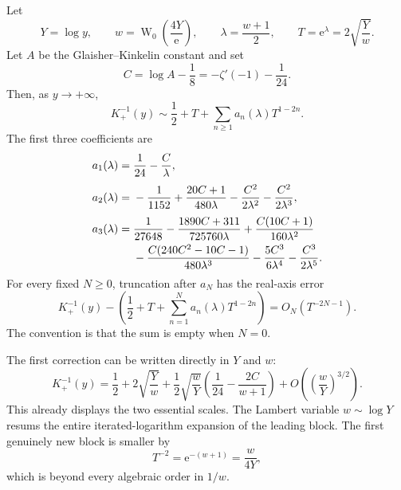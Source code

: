 \documentclass[11pt,oneside]{article}
\theoremstyle{plain}
\theoremstyle{definition}
\theoremstyle{remark}
\newcommand{\W}{\operatorname{W}}
\newcommand{\e}{\mathrm{e}}
\begin{document}
\begin{mainbox}
Let
\begin{equation}
 Y=\log y,
 \qquad w=\W_0\!\left(\frac{4Y}{\e}\right),
 \qquad \lambda=\frac{w+1}{2},
 \qquad T=\e^\lambda=2\sqrt{\frac{Y}{w}}.
 \label{eq:main-variables}
\end{equation}
Let \(A\) be the Glaisher--Kinkelin constant and set
\begin{equation}
 C=\log A-\frac18=-\zeta'(-1)-\frac1{24}.
 \label{eq:C-def}
\end{equation}
Then, as \(y\to+\infty\),
\begin{equation}
 K_+^{-1}(y)
 \sim \frac12+T+\sum_{n\ge1}a_n(\lambda)T^{1-2n}.
 \label{eq:main-transseries}
\end{equation}
The first three coefficients are
\begin{align}
 a_1(\lambda)={}&\frac1{24}-\frac{C}{\lambda},
 \label{eq:a1}\\[0.3em]
 a_2(\lambda)={}&-\frac1{1152}
 +\frac{20C+1}{480\lambda}
 -\frac{C^2}{2\lambda^2}
 -\frac{C^2}{2\lambda^3},
 \label{eq:a2}\\[0.3em]
 a_3(\lambda)={}&\frac1{27648}
 -\frac{1890C+311}{725760\lambda}
 +\frac{C(10C+1)}{160\lambda^2}
 \notag\\
 &-\frac{C(240C^2-10C-1)}{480\lambda^3}
 -\frac{5C^3}{6\lambda^4}
 -\frac{C^3}{2\lambda^5}.
 \label{eq:a3}
\end{align}
For every fixed \(N\ge0\), truncation after \(a_N\) has the real-axis error
\begin{equation}
 K_+^{-1}(y)-\left(\frac12+T+
       \sum_{n=1}^{N}a_n(\lambda)T^{1-2n}\right)
 =O_N(T^{-2N-1}).
 \label{eq:main-error}
\end{equation}
The convention is that the sum is empty when \(N=0\).
\end{mainbox}

The first correction can be written directly in \(Y\) and \(w\):
\begin{equation}
 K_+^{-1}(y)
 =\frac12+2\sqrt{\frac{Y}{w}}
 +\frac12\sqrt{\frac{w}{Y}}
   \left(\frac1{24}-\frac{2C}{w+1}\right)
 +O\!\left(\left(\frac{w}{Y}\right)^{3/2}\right).
 \label{eq:first-correction-Yw}
\end{equation}
This already displays the two essential scales.  The Lambert variable
\(w\sim\log Y\) resums the entire iterated-logarithm expansion of the leading
block.  The first genuinely new block is smaller by
\begin{equation}
 T^{-2}=\e^{-(w+1)}=\frac{w}{4Y},
 \label{eq:q-def-intro}
\end{equation}
which is beyond every algebraic order in \(1/w\).
\end{document}
